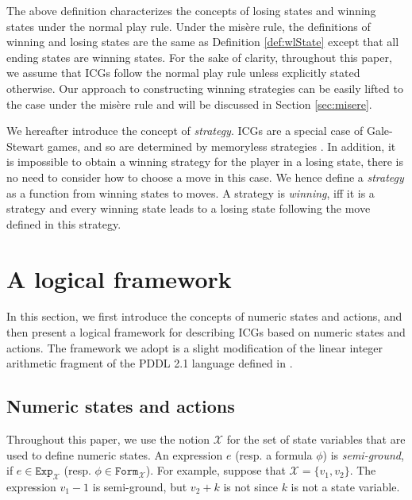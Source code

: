 \documentclass[review]{elsarticle}
\newcommand{\Exp}{\mathtt{Exp}}
\newcommand{\formula}{\mathtt{Form}}
\newcommand{\set}[1]{\{ #1 \}}
\newcommand{\statevar}{\mathcal{X}}
\begin{document}
	The above definition characterizes the concepts of losing states and winning states under the normal play rule.
	Under the mis\`{e}re rule, the definitions of winning and losing states are the same as Definition \ref{def:wlState} except that all ending states are winning states.
	For the sake of clarity, throughout this paper, we assume that ICGs follow the normal play rule unless explicitly stated otherwise.
	Our approach to constructing winning strategies can be easily lifted to the case under the mis\`{e}re rule and will be discussed in Section \ref{sec:misere}.

	We hereafter introduce the concept of \textit{strategy}.
	ICGs are a special case of Gale-Stewart games, and so are determined by memoryless strategies \cite{GalS1953}.
	In addition, it is impossible to obtain a winning strategy for the player in a losing state, there is no need to consider how to choose a move in this case.
	We hence define a \textit{strategy} as a function from winning states to moves.
	A strategy is \textit{winning}, iff it is a strategy and every winning state leads to a losing state following the move defined in this strategy.


	
\section{A logical framework}
	In this section, we first introduce the concepts of numeric states and actions, and then present a logical framework for describing ICGs based on numeric states and actions.
	The framework we adopt is a slight modification of the linear integer arithmetic fragment of the PDDL 2.1 language defined in \cite{FoxL2003}.
	

	\subsection{Numeric states and actions}
	Throughout this paper, we use the notion $\statevar$ for the set of state variables that are used to define numeric states.
	An expression $e$ (resp. a formula $\phi$) is \textit{semi-ground}, if $e \in \Exp_{\statevar}$ (resp. $\phi \in \formula_{\statevar}$).
	For example, suppose that $\statevar = \set{v_1, v_2}$.
	The expression $v_1 - 1$ is semi-ground, but $v_2 + k$ is not since $k$ is not a state variable.
	
\end{document}
